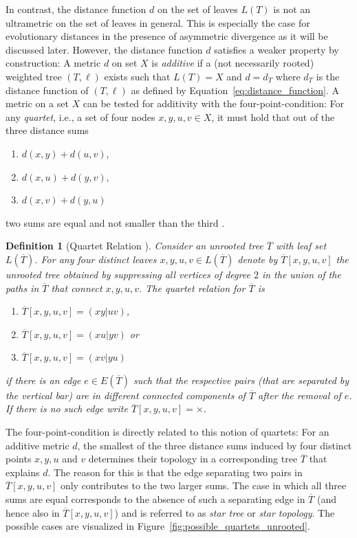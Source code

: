 \documentclass[hidelinks,11pt]{scrreprt}
\newtheorem{definition}[theorem]{Definition}
\newcommand{\unrooted}[1]{\overline{#1}}
\begin{document}
In contrast, the distance function $d$ on the set of leaves $L(T)$ is not an ultrametric on the set of leaves in general. This is especially the case for evolutionary distances in the presence of asymmetric divergence as it will be discussed later. However, the distance function $d$ satisfies a weaker property by construction: A metric $d$ on set $X$ is \emph{additive} if a (not necessarily rooted) weighted tree $(T,\ell)$ exists such that $L(T)=X$ and $d=d_T$ where $d_T$ is the distance function of $(T,\ell)$ as defined by Equation~\ref{eq:distance_function}. A metric on a set $X$ can be tested for additivity with the four-point-condition: For any \emph{quartet}, i.e., a set of four nodes $x,y,u,v  \in X$, it must hold that out of the three distance sums
\begin{enumerate}[label=(\roman*), itemsep=0.2cm, topsep=0.2cm, parsep=0cm]
	\item $d(x,y)+d(u,v)$,
	\item $d(x,u)+d(y,v)$,
	\item $d(x,v)+d(y,u)$
\end{enumerate}
two sums are equal and not smaller than the third \citep[cf.][]{simoespereira1969,buneman1974}.

\begin{definition}[Quartet Relation {\citep[cf.][]{stadler2020}}]
	\label{def:quartet_relation}
	Consider an unrooted tree $\unrooted{T}$ with leaf set $L(\unrooted{T})$. For any four distinct leaves $x,y,u,v\in L(\unrooted{T})$ denote by $\unrooted{T}[x,y,u,v]$ the unrooted tree obtained by suppressing all vertices of degree $2$ in the union of the paths in $\unrooted{T}$ that connect $x,y,u,v$. The \emph{quartet relation} for $\unrooted{T}$ is
	\begin{enumerate}[label=(\roman*), itemsep=0.2cm, topsep=0.2cm, parsep=0cm]
		\item $\unrooted{T}[x,y,u,v]=(xy|uv)$,
		\item $\unrooted{T}[x,y,u,v]=(xu|yv)$ or
		\item $\unrooted{T}[x,y,u,v]=(xv|yu)$
	\end{enumerate}
	if there is an edge $e\in E(\unrooted{T})$ such that the respective pairs (that are separated by the vertical bar) are in different connected components of $\unrooted{T}$ after the removal of $e$. If there is no such edge write $\unrooted{T}[x,y,u,v]=\times$.
\end{definition}

The four-point-condition is directly related to this notion of quartets: For an additive metric $d$, the smallest of the three distance sums induced by four distinct points $x,y,u$ and $v$ determines their topology in a corresponding tree $\unrooted{T}$ that explains $d$. The reason for this is that the edge separating two pairs in $\unrooted{T}[x,y,u,v]$ only contributes to the two larger sums. The case in which all three sums are equal corresponds to the absence of such a separating edge in $\unrooted{T}$ (and hence also in $\unrooted{T}[x,y,u,v]$) and is referred to as \emph{star tree} or \emph{star topology}. The possible cases are visualized in Figure~\ref{fig:possible_quartets_unrooted}.
\end{document}
